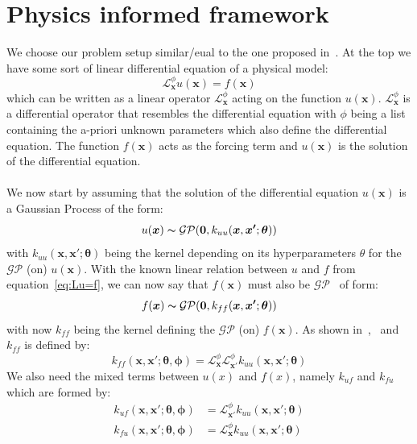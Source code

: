 \documentclass{article}
\begin{document}
\section{Physics informed framework}
We choose our problem setup similar/eual to the one proposed in~\cite{RAISSI}. At the top we 
have some sort of linear differential equation of a physical model:
\begin{equation}
    \label{eq:Lu=f}
    \mathcal{L}_{\bm{x}}^\phi u(\bm{x}) = f(\bm{x})
\end{equation}
which can be written as a linear operator $\mathcal{L}_{\bm{x}}^\phi$ acting on the function $u(\bm{x})$. $\mathcal{L}_{\bm{x}}^\phi$ is a differential operator that resembles the differential equation with $\phi$ being a list containing the a-priori unknown parameters which also define the differential equation. The function $f(\bm{x})$ acts as the forcing term and $u(\bm{x})$ is the solution of the differential equation.  \\
\\
We now start by assuming that the solution of the differential equation $u(\bm{x})$ is a Gaussian Process of the form:
\begin{equation}
    u(\bm{x}) \thicksim \mathcal{G}\mathcal{P}(\bm{0},k_{uu}(\bm{x},\bm{x'};\bm{\theta}))
\end{equation}
with $k_{uu}(\bm{x},\bm{x'};\bm{\theta})$ being the kernel depending on its hyperparameters $\theta$ for the $\mathcal{G}\mathcal{P}$ (on) $u(\bm{x})$. With the known linear relation between $u$ and $f$ from equation~\ref{eq:Lu=f}, we can now say that $f(\bm{x})$ must also be $\mathcal{G}\mathcal{P}$~\cite{RasmussenCarlEdward} of form:
\begin{equation}
    f(\bm{x}) \thicksim \mathcal{G}\mathcal{P}(\bm{0},k_{ff}(\bm{x},\bm{x'};\bm{\theta}))
\end{equation}
with now $k_{ff}$ being the kernel defining the $\mathcal{G}\mathcal{P}$ (on) $f(\bm{x})$. As shown in~\cite{garnett_2023_full},~\cite{Särkkä} and~\cite{RAISSI} $k_{ff}$ is defined by:
\begin{equation}
    \label{eq:kff}
    k_{ff}(\bm{x},\bm{x'};\bm{\theta}, \bm{\phi}) = \mathcal{L}_{\bm{x}}^\phi \mathcal{L}_{\bm{x'}}^\phi k_{uu}(\bm{x},\bm{x'};\bm{\theta})
\end{equation}
We also need the mixed terms between $u(x)$ and $f(x)$, namely $k_{uf}$ and $k_{fu}$ which are formed by:
\begin{equation}
    \label{eq:kuf_kfu}
    \begin{aligned}
        k_{uf}(\bm{x,x'};\bm{\theta,\phi}) & = \mathcal{L}_{\bm{x'}}^\phi k_{uu}(\bm{x},\bm{x'};\bm{\theta}) \\
        k_{fu}(\bm{x,x'};\bm{\theta,\phi}) & = \mathcal{L}_{\bm{x}}^\phi k_{uu}(\bm{x},\bm{x'};\bm{\theta})
    \end{aligned}
\end{equation}
\end{document}
